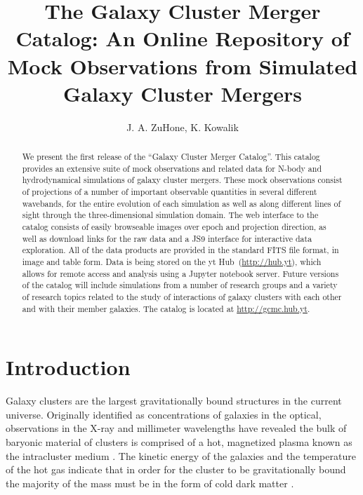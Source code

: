 \documentclass{emulateapj}
\begin{document}
\title{The Galaxy Cluster Merger Catalog: An Online Repository of Mock Observations from Simulated Galaxy Cluster Mergers}

\author{J. A. ZuHone, K. Kowalik}


\begin{abstract}
We present the first release of the ``Galaxy Cluster Merger Catalog''. This catalog provides an extensive suite of mock observations and related data for N-body and hydrodynamical simulations of galaxy cluster mergers. These mock observations consist of projections of a number of important observable quantities in several different wavebands, for the entire evolution of each simulation as well as along different lines of sight through the three-dimensional simulation domain. The web interface to the catalog consists of easily browseable images over epoch and projection direction, as well as download links for the raw data and a JS9 interface for interactive data exploration. All of the data products are provided in the standard FITS file format, in image and table form. Data is being stored on the yt Hub~(\url{http://hub.yt}), which allows for remote access and analysis using a Jupyter notebook server. Future versions of the catalog will include simulations from a number of research groups and a variety of research topics related to the study of interactions of galaxy clusters with each other and with their member galaxies. The catalog is located at \url{http://gcmc.hub.yt}.
\end{abstract}

\section{Introduction}\label{sec:intro}

Galaxy clusters are the largest gravitationally bound structures in the current universe. Originally identified as concentrations of galaxies in the optical, observations in the X-ray and millimeter wavelengths have revealed the bulk of baryonic material of clusters is comprised of a hot, magnetized plasma known as the intracluster medium \citep[ICM,][]{for72,sun72}. The kinetic energy of the galaxies and the temperature of the hot gas indicate that in order for the cluster to be gravitationally bound the majority of the mass must be in the form of cold dark matter \citep[CDM, first noted by][]{zwi37}.
\end{document}
